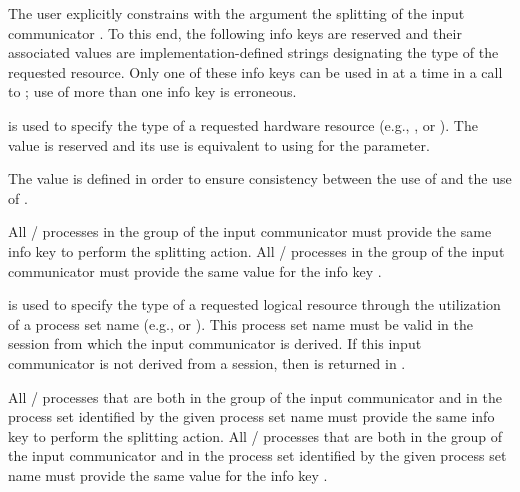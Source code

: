 \begin{description}
  The user explicitly constrains with the  argument the splitting of the input communicator
  . To this end, the following info keys are reserved and their associated values
  are implementation-defined strings designating the type of the requested resource. Only one of these info
  keys can be used in  at a time in a call to ; use of more than
  one info key is erroneous.

  \begin{description}
  \item {} is used to specify the type of a requested hardware resource (e.g., ,
     or ). The value  is reserved and its use is equivalent
    to using  for the  parameter.
    \begin{rationale}
      The value  is defined in order to ensure consistency between
      the use of  and the use of .
    \end{rationale}

    All \MPI/ processes in the group of the input communicator  must provide the same info key to perform the splitting action.
    All \MPI/ processes in the group of the input communicator  must provide the same value for the info key .

  \item {} is used to specify the type of a requested logical resource through the utilization
    of a process set name (e.g.,  or ). This process set name must be valid in the session
    from which the input communicator  is derived. If this input communicator is not derived from a session,
    then  is returned in .

    All \MPI/ processes that are both in the group of the input communicator  and in the process set identified by the given process set name
    must provide the same info key to perform the splitting action.
    All \MPI/ processes that are both in the group of the input communicator  and in the process set identified by the given process set name
    must provide the same value for the info key .
  \end{description}
  

\end{description}
